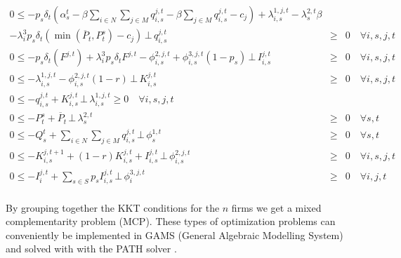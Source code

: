 \begin{align}
0\leq - p_s\delta_t\left(\alpha_s^t-\beta \sum_{i\in N}\sum_{j\in M} q_{i,s}^{j,t}-\beta\sum_{j\in M}q_{i,s}^{j,t}-c_j\right)+\lambda_{i,s}^{1,j,t} - \lambda_{s}^{2,t}\beta\nonumber\\ -\lambda_i^3p_s\delta_t\left(\min\left(\overline{P}_t,P_t^s\right)-c_j\right) \,\bot\, q_{i,s}^{j,t}&\geq& 0  \quad \forall i,s,j,t\\
0\leq - p_s\delta_t\left(F^{j,t}\right)+\lambda_i^3p_s\delta_tF^{j,t}- \phi_{i,s}^{2,j,t}+\phi_{i,s}^{3,j,t}\left(1-p_s\right)\,\bot\, I_{i,s}^{j,t}&\geq& 0  \quad \forall i,s,j,t\\
0 \leq -\lambda_{i,s}^{1,j,t}  -\phi_{i,s}^{2,j,t}(1-r) \,\bot\, K_{i,s}^{j,t}&\geq& 0  \quad \forall i,s,j,t\\
0\leq -q_{i,s}^{j,t} + K_{i,s}^{j,t} \,\bot\, \lambda_{i,s}^{1,j,t}\geq 0  \quad \forall i,s,j,t\\
0\leq -P_t^s + \overline{P}_t \,\bot\, \lambda_{s}^{2,t}&\geq& 0  \quad \forall s,t\\
0 \leq -Q_s^t+\sum_{i\in N}\sum_{j\in M} q_{i,s}^{j,t} \,\bot\, \phi_{s}^{1,t}&\geq& 0  \quad \forall s,t\\
0 \leq -K_{i,s}^{j,t+1} + (1-r)K_{i,s}^{j,t}+I_{i,s}^{j,t} \,\bot\, \phi_{i,s}^{2,j,t}&\geq& 0  \quad \forall i,s,j,t\\
0 \leq -I_{i}^{j,t}+\sum_{s\in S}p_sI_{i,s}^{j,t} \,\bot\, \phi_{i}^{3,j,t}&\geq& 0  \quad \forall i,j,t\\
\end{align}


By grouping together the KKT conditions for the $n$ firms we get a mixed complementarity problem (MCP). These types of optimization problems can conveniently be implemented in GAMS (General Algebraic Modelling System) and solved with with the PATH solver \citep[see][]{Ferris2000}.

